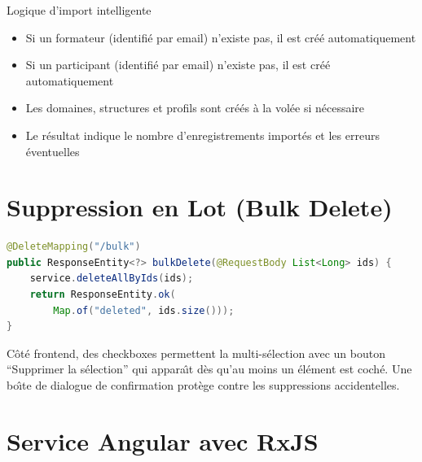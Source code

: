 \documentclass[12pt,a4paper]{report}
\begin{document}
\begin{infobox}{Logique d'import intelligente}
\begin{itemize}
  \item Si un formateur (identifi\'{e} par email) n'existe pas, il est cr\'{e}\'{e} automatiquement
  \item Si un participant (identifi\'{e} par email) n'existe pas, il est cr\'{e}\'{e} automatiquement
  \item Les domaines, structures et profils sont cr\'{e}\'{e}s \`{a} la vol\'{e}e si n\'{e}cessaire
  \item Le r\'{e}sultat indique le nombre d'enregistrements import\'{e}s et les erreurs \'{e}ventuelles
\end{itemize}
\end{infobox}

\section{Suppression en Lot (Bulk Delete)}

\begin{lstlisting}[language=Java, caption={ParticipantController.java --- Suppression en lot}]
@DeleteMapping("/bulk")
public ResponseEntity<?> bulkDelete(@RequestBody List<Long> ids) {
    service.deleteAllByIds(ids);
    return ResponseEntity.ok(
        Map.of("deleted", ids.size()));
}
\end{lstlisting}

C\^{o}t\'{e} frontend, des checkboxes permettent la multi-s\'{e}lection avec un bouton ``Supprimer la s\'{e}lection'' qui appara\^{\i}t d\`{e}s qu'au moins un \'{e}l\'{e}ment est coch\'{e}. Une bo\^{\i}te de dialogue de confirmation prot\`{e}ge contre les suppressions accidentelles.
\section{Service Angular avec RxJS}
\end{document}
